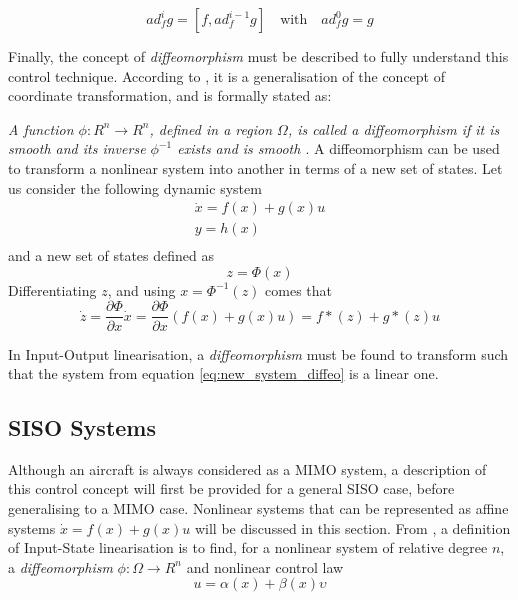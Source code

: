 \begin{equation}
ad_f^ig=[f, ad_f^{i-1}g] \quad \text{with} \quad ad_f^0g=g
\end{equation}

Finally, the concept of \emph{diffeomorphism} must be described to fully understand this control technique. According to \cite{Slotine+Li}, it is a generalisation of the concept of coordinate transformation, and is formally stated as:

\emph{A function $\phi: R^n\rightarrow R^n$, defined in a region $\Omega$, is called a diffeomorphism if it is smooth and its inverse $\phi^{-1}$ exists and is smooth \cite{Slotine+Li}}. A diffeomorphism can be used to transform a nonlinear system into another in terms of a new set of states. Let us consider the following  dynamic system
\begin{gather}
\dot{x}=f(x)+g(x)u\\
y=h(x)\\
\end{gather}
and a new set of states defined as
\begin{equation}
z=\Phi(x)
\end{equation}
Differentiating $z$, and using $x=\Phi^{-1}(z)$ comes that
\begin{equation}
\dot{z}=\dfrac{\partial \Phi}{\partial x}\dot{x}= \dfrac{\partial\Phi}{\partial x}(f(x)+g(x)u)=f*(z)+g*(z)u
\label{eq:new_system_diffeo}
\end{equation}

In Input-Output linearisation, a \emph{diffeomorphism} must be found to transform such that the system from equation \ref{eq:new_system_diffeo} is a linear one.
\subsection{SISO Systems}
\label{section:background/SISO_NLI}

Although an aircraft is always considered as a MIMO system, a description of this control concept will first be provided for a general SISO case, before generalising to a MIMO case. Nonlinear systems that can be represented as affine systems $\dot{x}=f(x)+g(x)u$ will be discussed in this section. From \cite{Slotine+Li}, a definition of Input-State linearisation is to find, for a nonlinear system of relative degree $n$, a \emph{diffeomorphism} $\phi:\Omega \rightarrow R^n$ and nonlinear control law
\begin{equation}
u=\alpha(x) + \beta(x)\upsilon
\label{eq:nli_control_law}
\end{equation}

